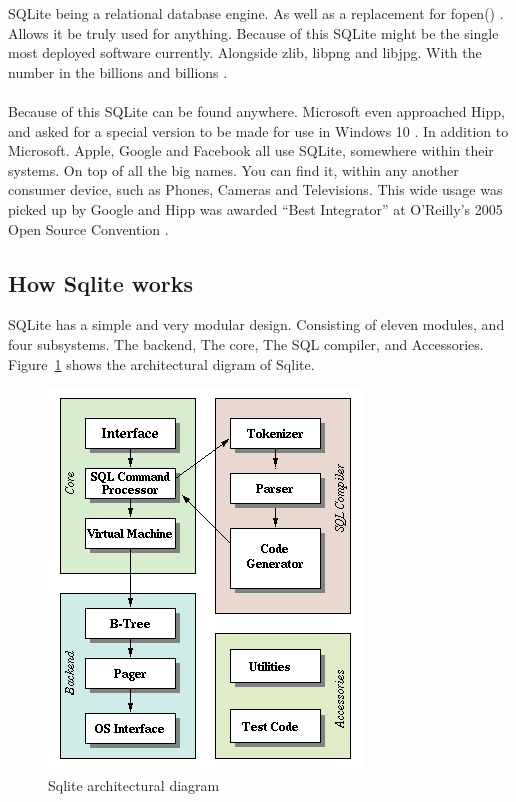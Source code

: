 SQLite being a relational database engine. As well as a replacement for fopen() \citep{sqlite}. Allows it be truly used for anything. Because of this SQLite might be the single most deployed software currently. Alongside zlib, libpng and libjpg. With the number in the billions and billions \citep{sqlite}.
\\\\
Because of this SQLite can be found anywhere. Microsoft even approached Hipp, and asked for a special version to be made for use in Windows 10 \citep{sqlitetalk}. In addition to Microsoft. Apple, Google and Facebook all use SQLite, somewhere within their systems. On top of all the big names. You can find it, within any another consumer device, such as Phones, Cameras and Televisions. This wide usage was picked up by Google and Hipp was awarded “Best Integrator” at O’Reilly’s 2005 Open Source Convention \citep{sqlitedefguide}. 

\subsection{How Sqlite works}
\label{subsec:how_sqlite_works}

SQLite has a simple and very modular design. Consisting of eleven modules, and four subsystems. The backend, The core, The SQL compiler, and Accessories. Figure~\ref{fig:sqlite_arch} shows the architectural digram of Sqlite.

\begin{figure}[H]
	\centering
	\includegraphics[scale=0.50]{images/sqlite_arch.png}
	\caption{Sqlite architectural diagram \citep{sqlite}}
	\label{fig:sqlite_arch}
\end{figure}

